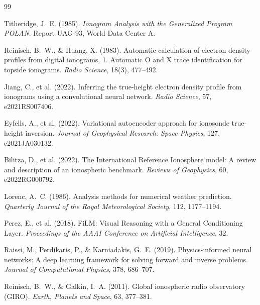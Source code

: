 \documentclass[11pt,twocolumn]{article}
\begin{document}
\begin{thebibliography}{99}
\small

Titheridge, J.~E. (1985).
\textit{Ionogram Analysis with the Generalized Program POLAN}.
Report UAG-93, World Data Center A.

Reinisch, B.~W., \& Huang, X. (1983).
Automatic calculation of electron density profiles from digital
ionograms, 1. Automatic O and X trace identification for topside ionograms.
\textit{Radio Science}, 18(3), 477--492.

Jiang, C., et al. (2022).
Inferring the true-height electron density profile from ionograms
using a convolutional neural network.
\textit{Radio Science}, 57, e2021RS007406.

Eyfells, A., et al. (2022).
Variational autoencoder approach for ionosonde true-height inversion.
\textit{Journal of Geophysical Research: Space Physics}, 127, e2021JA030132.

Bilitza, D., et al. (2022).
The International Reference Ionosphere model: A review and
description of an ionospheric benchmark.
\textit{Reviews of Geophysics}, 60, e2022RG000792.

Lorenc, A.~C. (1986).
Analysis methods for numerical weather prediction.
\textit{Quarterly Journal of the Royal Meteorological Society}, 112, 1177--1194.

Perez, E., et al. (2018).
FiLM: Visual Reasoning with a General Conditioning Layer.
\textit{Proceedings of the AAAI Conference on Artificial Intelligence}, 32.

Raissi, M., Perdikaris, P., \& Karniadakis, G.~E. (2019).
Physics-informed neural networks: A deep learning framework for
solving forward and inverse problems.
\textit{Journal of Computational Physics}, 378, 686--707.

Reinisch, B.~W., \& Galkin, I.~A. (2011).
Global ionospheric radio observatory (GIRO).
\textit{Earth, Planets and Space}, 63, 377--381.

\end{thebibliography}
\end{document}
